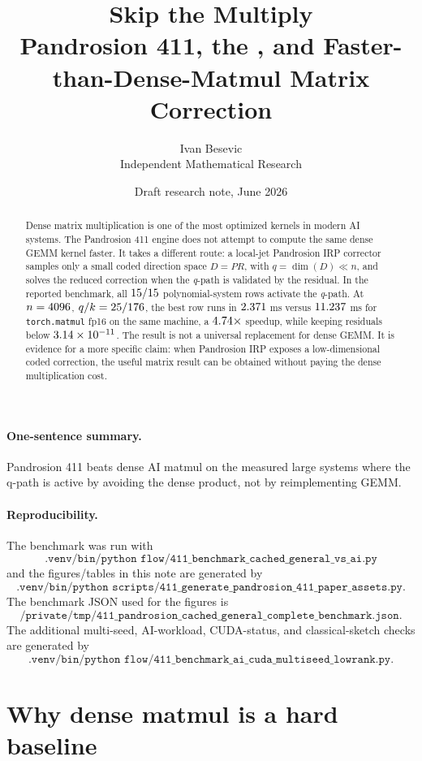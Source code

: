 \documentclass[11pt]{article}
\title{\textbf{Skip the Multiply}\\[-1mm]
\large Pandrosion 411, the \qpath, and Faster-than-Dense-Matmul Matrix Correction}
\author{Ivan Besevic\\Independent Mathematical Research}
\date{Draft research note, June 2026}
\newcommand{\qpath}{\textit{q}\nobreakdash-path}
\begin{document}
\maketitle

\begin{abstract}
Dense matrix multiplication is one of the most optimized kernels in modern AI
systems.  The Pandrosion 411 engine does not attempt to compute the same dense
GEMM kernel faster.  It takes a different route: a local-jet Pandrosion IRP
corrector samples only a small coded direction space \(D=P R\), with
\(q=\dim(D)\ll n\), and solves the reduced correction when the \qpath{} is
validated by the residual.  In the reported benchmark, all
\(15/15\) polynomial-system rows activate the \qpath.  At
\(n=4096\), \(q/k=25/176\), the best row runs in
\(2.371\) ms versus \(11.237\) ms for
\texttt{torch.matmul} fp16 on the same machine, a \(4.74
\times\) speedup, while keeping residuals below \(3.14\times 10^{-11}\).  The result
is not a universal replacement for dense GEMM.  It is evidence for a more
specific claim: when Pandrosion IRP exposes a low-dimensional coded correction,
the useful matrix result can be obtained without paying the dense multiplication
cost.
\end{abstract}

\paragraph{One-sentence summary.}
Pandrosion 411 beats dense AI matmul on the measured large systems where the
q-path is active by avoiding the dense product, not by reimplementing GEMM.

\paragraph{Reproducibility.}
The benchmark was run with
\[
\texttt{.venv/bin/python flow/411\_benchmark\_cached\_general\_vs\_ai.py}
\]
and the figures/tables in this note are generated by
\[
\texttt{.venv/bin/python scripts/411\_generate\_pandrosion\_411\_paper\_assets.py}.
\]
The benchmark JSON used for the figures is
\[
\texttt{/private/tmp/411\_pandrosion\_cached\_general\_complete\_benchmark.json}.
\]
The additional multi-seed, AI-workload, CUDA-status, and classical-sketch
checks are generated by
\[
\texttt{.venv/bin/python flow/411\_benchmark\_ai\_cuda\_multiseed\_lowrank.py}.
\]

\section{Why dense matmul is a hard baseline}
\end{document}
